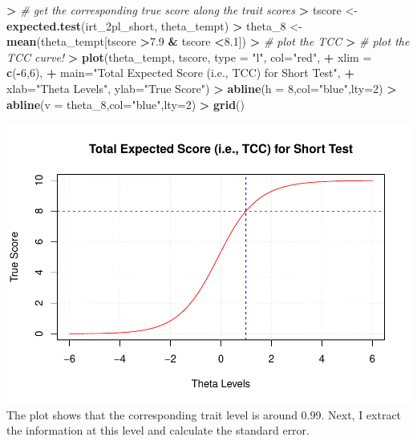\documentclass[
]{article}
\newenvironment{Shaded}{\begin{snugshade}}{\end{snugshade}}
\newcommand{\AttributeTok}[1]{\textcolor[rgb]{0.13,0.29,0.53}{#1}}
\newcommand{\CommentTok}[1]{\textcolor[rgb]{0.56,0.35,0.01}{\textit{#1}}}
\newcommand{\DecValTok}[1]{\textcolor[rgb]{0.00,0.00,0.81}{#1}}
\newcommand{\ErrorTok}[1]{\textcolor[rgb]{0.64,0.00,0.00}{\textbf{#1}}}
\newcommand{\FloatTok}[1]{\textcolor[rgb]{0.00,0.00,0.81}{#1}}
\newcommand{\FunctionTok}[1]{\textcolor[rgb]{0.13,0.29,0.53}{\textbf{#1}}}
\newcommand{\NormalTok}[1]{#1}
\newcommand{\OtherTok}[1]{\textcolor[rgb]{0.56,0.35,0.01}{#1}}
\newcommand{\SpecialCharTok}[1]{\textcolor[rgb]{0.81,0.36,0.00}{\textbf{#1}}}
\newcommand{\StringTok}[1]{\textcolor[rgb]{0.31,0.60,0.02}{#1}}
\begin{document}
\begin{Shaded}
\begin{Highlighting}[]
\SpecialCharTok{\textgreater{}} \CommentTok{\# get the corresponding true score along the trait scores}
\ErrorTok{\textgreater{}}\NormalTok{ tscore }\OtherTok{\textless{}{-}} \FunctionTok{expected.test}\NormalTok{(irt\_2pl\_short, theta\_tempt)}
\SpecialCharTok{\textgreater{}}\NormalTok{ theta\_8 }\OtherTok{\textless{}{-}} \FunctionTok{mean}\NormalTok{(theta\_tempt[tscore }\SpecialCharTok{\textgreater{}}\FloatTok{7.9} \SpecialCharTok{\&}\NormalTok{ tscore }\SpecialCharTok{\textless{}}\FloatTok{8.1}\NormalTok{])}
\SpecialCharTok{\textgreater{}} \CommentTok{\# plot the TCC }
\ErrorTok{\textgreater{}} \CommentTok{\# plot the TCC curve!}
\ErrorTok{\textgreater{}} \FunctionTok{plot}\NormalTok{(theta\_tempt, tscore, }\AttributeTok{type =} \StringTok{"l"}\NormalTok{, }\AttributeTok{col=}\StringTok{"red"}\NormalTok{,}
\SpecialCharTok{+}      \AttributeTok{xlim =} \FunctionTok{c}\NormalTok{(}\SpecialCharTok{{-}}\DecValTok{6}\NormalTok{,}\DecValTok{6}\NormalTok{),}
\SpecialCharTok{+}      \AttributeTok{main=}\StringTok{"Total Expected Score (i.e., TCC) for Short Test"}\NormalTok{,}
\SpecialCharTok{+}      \AttributeTok{xlab=}\StringTok{"Theta Levels"}\NormalTok{, }\AttributeTok{ylab=}\StringTok{"True Score"}\NormalTok{)}
\SpecialCharTok{\textgreater{}} \FunctionTok{abline}\NormalTok{(}\AttributeTok{h =} \DecValTok{8}\NormalTok{,}\AttributeTok{col=}\StringTok{"blue"}\NormalTok{,}\AttributeTok{lty=}\DecValTok{2}\NormalTok{)}
\SpecialCharTok{\textgreater{}} \FunctionTok{abline}\NormalTok{(}\AttributeTok{v =}\NormalTok{ theta\_8,}\AttributeTok{col=}\StringTok{"blue"}\NormalTok{,}\AttributeTok{lty=}\DecValTok{2}\NormalTok{)}
\SpecialCharTok{\textgreater{}} \FunctionTok{grid}\NormalTok{()}
\end{Highlighting}
\end{Shaded}

\includegraphics{Assignment_4_files/figure-latex/unnamed-chunk-16-1.pdf}
The plot shows that the corresponding trait level is around 0.99. Next,
I extract the information at this level and calculate the standard
error.
\end{document}
